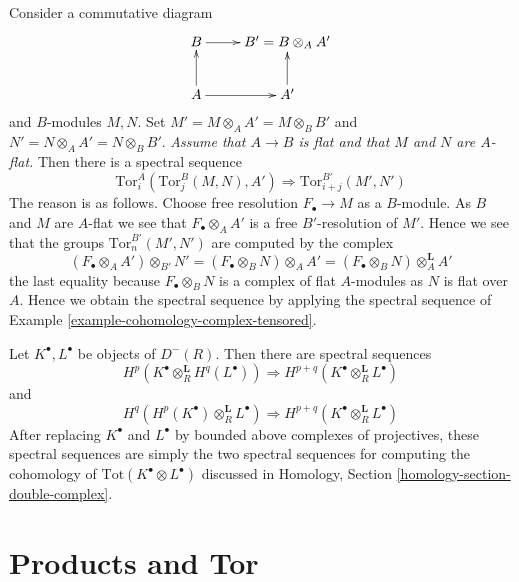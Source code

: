 \begin{example}
\label{example-tor-base-change}
Consider a commutative diagram
$$
\xymatrix{
B \ar[r] & B' = B \otimes_A A' \\
A \ar[r] \ar[u] & A' \ar[u]
}
$$
and $B$-modules $M, N$. Set $M' = M \otimes_A A' = M \otimes_B B'$
and $N' = N \otimes_A A' = N \otimes_B B'$.
{\it Assume that $A \to B$ is flat and that $M$ and $N$ are $A$-flat.}
Then there is a spectral sequence
$$
\text{Tor}^A_i(\text{Tor}_j^B(M, N), A')
\Rightarrow
\text{Tor}^{B'}_{i + j}(M', N')
$$
The reason is as follows. Choose free resolution
$F_\bullet \to M$ as a $B$-module. As $B$ and $M$ are $A$-flat we see
that $F_\bullet \otimes_A A'$ is a free $B'$-resolution of $M'$.
Hence we see that the groups $\text{Tor}^{B'}_n(M', N')$ are
computed by the complex
$$
(F_\bullet \otimes_A A') \otimes_{B'} N' =
(F_\bullet \otimes_B N) \otimes_A A' =
(F_\bullet \otimes_B N) \otimes^{\mathbf{L}}_A A'
$$
the last equality because $F_\bullet \otimes_B N$ is a complex
of flat $A$-modules as $N$ is flat over $A$. Hence we obtain the
spectral sequence by applying the spectral sequence of
Example \ref{example-cohomology-complex-tensored}.
\end{example}

\begin{example}
\label{example-tor}
Let $K^\bullet, L^\bullet$ be objects of $D^{-}(R)$.
Then there are spectral sequences
$$
H^p(K^\bullet \otimes_R^{\mathbf{L}} H^q(L^\bullet))
\Rightarrow H^{p + q}(K^\bullet \otimes_R^{\mathbf{L}} L^\bullet)
$$
and
$$
H^q(H^p(K^\bullet) \otimes_R^{\mathbf{L}} L^\bullet)
\Rightarrow H^{p + q}(K^\bullet \otimes_R^{\mathbf{L}} L^\bullet)
$$
After replacing $K^\bullet$ and $L^\bullet$ by bounded above complexes
of projectives, these spectral sequences are simply the two spectral
sequences for computing the cohomology of
$\text{Tot}(K^\bullet \otimes L^\bullet)$ discussed in
Homology, Section \ref{homology-section-double-complex}.
\end{example}









\section{Products and Tor}
\label{section-products-tor}

